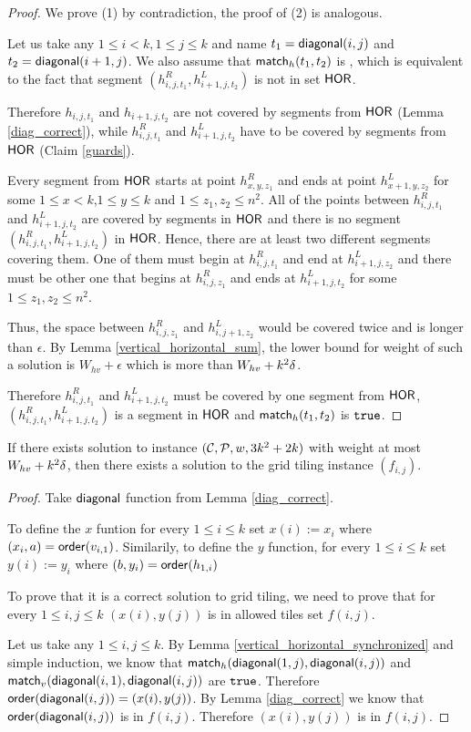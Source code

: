 \begin{proof}
We prove (1) by contradiction, the proof of (2) is analogous.

Let us take any $1 \le i < k, 1 \le j \le k$
and name $t_1 = \mathsf{diagonal}(i, j)$ and $t_2 = \mathsf{diagonal}(i+1, j)$.
We also assume that $\mathsf{match}_h(t_1,t_2)$ is \false,
which is equivalent to the fact that
segment $(h_{i,j,t_1}^R, h_{i+1,j,t_2}^L)$
is not in set $\mathsf{HOR}$.

Therefore $h_{i,j,t_1}$ and $h_{i+1,j,t_2}$
are not covered by segments from $\mathsf{HOR}$ (Lemma \ref{diag_correct}),
while $h^R_{i,j,t_1}$ and $h^L_{i+1,j,t_2}$
have to be covered by segments from $\mathsf{HOR}$ (Claim \ref{guards}).

Every segment from $\mathsf{HOR}$ starts at point $h^R_{x,y,z_1}$
and ends at point $h^L_{x+1,y,z_2}$ for some
$1 \le x < k$,$1 \le y \le k$ and $1 \le z_1, z_2 \le n^2$.
All of the points between $h^R_{i,j,t_1}$ and $h^L_{i+1,j,t_2}$
are covered by segments in $\mathsf{HOR}$ 
and there is no segment $(h^R_{i,j,t_1}, h^L_{i+1,j,t_2})$ in $\mathsf{HOR}$.
Hence, there are at least two different segments covering them.
One of them must begin
at $h^R_{i,j,t_1}$ and end at $h^L_{i+1,j,z_2}$
and there must be other one that begins at $h^R_{i,j,z_1}$
and ends at $h^L_{i+1,j,t_2}$
for some $1 \le z_1, z_2 \le n^2$.

Thus, the space between $h^R_{i,j,z_1}$ and $h^L_{i,j+1,z_2}$
would be covered twice and is longer than $\epsilon$.
By Lemma \ref{vertical_horizontal_sum},
the lower bound for weight of such a solution is $W_{hv} + \epsilon$
which is more than $W_{hv} +k^2\delta$.

Therefore $h^R_{i,j,t_1}$ and $h^L_{i+1,j,t_2}$ must be covered
by one segment from $\mathsf{HOR}$,
$(h^R_{i,j,t_1}, h^L_{i+1,j,t_2})$ is a segment in $\mathsf{HOR}$
and $\mathsf{match}_h(t_1,t_2)$ is $\texttt{true}$.
\end{proof}


\begin{lemma}
\label{grid_tiling_exists}
	If there exists solution to instance $(\mathcal{C}, \mathcal{P}, w, 3k^2+2k)$
	with weight at most $W_{hv} +k^2\delta$,
	then there exists a solution to the grid tiling instance $(f_{i,j})$.
\end{lemma}

\begin{proof}
Take $\mathsf{diagonal}$ function from Lemma \ref{diag_correct}.

To define the $x$ funtion 
for every $1 \le i \le k$ set $x(i) := x_i$
where $(x_i, a) = \mathsf{order}(v_{i,1})$.
Similarily, to define the $y$ function,
for every $1 \le i \le k$ set $y(i) := y_i$
where $(b, y_i) = \mathsf{order}(h_{1,i})$

To prove that it is a correct solution to grid tiling,
we need to prove that 
for every $1 \le i,j \le k$ $(x(i), y(j))$ is in
allowed tiles set $f(i,j)$.

Let us take any $1 \le i,j \le k$.
By Lemma \ref{vertical_horizontal_synchronized}
and simple induction,
we know that $\mathsf{match}_h(\mathsf{diagonal}(1, j),\mathsf{diagonal}(i, j))$ and
$\mathsf{match}_v(\mathsf{diagonal}(i, 1),\mathsf{diagonal}(i, j))$ are $\texttt{true}$.
Therefore $\mathsf{order}(\mathsf{diagonal}(i,j)) = (x(i), y(j))$.
By Lemma \ref{diag_correct} we know that 
$\mathsf{order}(\mathsf{diagonal}(i,j))$ is in $f(i,j)$.
Therefore 
$(x(i), y(j))$
is in $f(i,j)$.
\end{proof}

